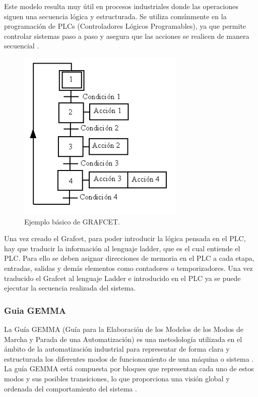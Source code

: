 Este modelo resulta muy útil en procesos industriales donde las operaciones siguen una secuencia lógica y estructurada. Se utiliza comúnmente en la programación de PLCs (Controladores Lógicos Programables), ya que permite controlar sistemas paso a paso y asegura que las acciones se realicen de manera secuencial \cite{grafcet_info}.

\begin{figure} [h!]
  \begin{center}
    \includegraphics[width=8cm]{figs/grafcet_def}
  \end{center}
  \caption{\centering Ejemplo básico de GRAFCET.}
  \label{fig:grafcet_def}
\end{figure} 

Una vez creado el Grafcet, para poder introducir la lógica pensada en el PLC, hay que traducir la información al lenguaje ladder, que es el cual entiende el PLC. Para ello se deben asignar direcciones de memoria en el PLC a cada etapa, entradas, salidas y demás elementos como contadores o temporizadores. Una vez traducido el Grafcet al lenguaje Ladder e introducido en el PLC ya se puede ejecutar la secuencia realizada del sistema.

\subsubsection{Guia GEMMA}

La Guía GEMMA (Guía para la Elaboración de los Modelos de los Modos de Marcha y Parada de una Automatización) es una metodología utilizada en el ámbito de la automatización industrial para representar de forma clara y estructurada los diferentes modos de funcionamiento de una máquina o sistema  \cite{guia_gemma}. La guía GEMMA está compuesta por bloques que representan cada uno de estos modos y sus posibles transiciones, lo que proporciona una visión global y ordenada del comportamiento del sistema  \cite{guia_gemma}.

